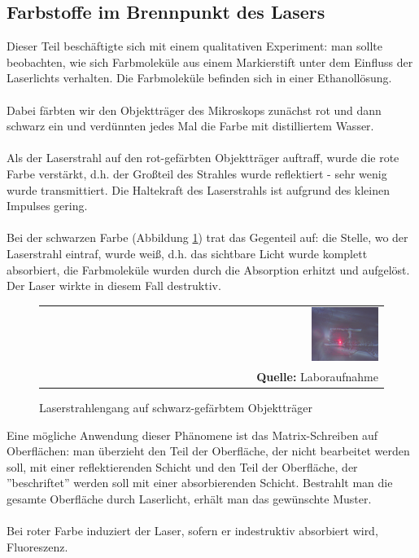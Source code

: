 \documentclass[a4paper,titlepage]{scrartcl}
\numberwithin{equation}{section}
\begin{document}
\subsection{Farbstoffe im Brennpunkt des Lasers}
Dieser Teil beschäftigte sich mit einem qualitativen Experiment: man sollte beobachten, wie sich Farbmoleküle aus einem Markierstift unter dem Einfluss der Laserlichts verhalten. Die Farbmoleküle befinden sich in einer Ethanollösung.\\ \\
Dabei färbten wir den Objektträger des Mikroskops zunächst rot und dann schwarz ein und verdünnten jedes Mal die Farbe mit distilliertem Wasser.\\ \\
Als der Laserstrahl auf den rot-gefärbten Objektträger auftraff, wurde die rote Farbe verstärkt, d.h. der Großteil des Strahles wurde reflektiert - sehr wenig wurde transmittiert. Die Haltekraft des Laserstrahls ist aufgrund des kleinen Impulses gering.\\ \\
Bei der schwarzen Farbe (Abbildung \ref{fig:laboraufnahme2}) trat das Gegenteil auf: die Stelle, wo der Laserstrahl eintraf, wurde weiß, d.h. das sichtbare Licht wurde komplett absorbiert, die Farbmoleküle wurden durch die Absorption erhitzt und aufgelöst. Der Laser wirkte in diesem Fall destruktiv.
\begin{figure}[H]
	\centering
	\begin{tabular}{@{}r@{}}
		\includegraphics[width=0.2\textwidth]{aufgabe3-7-schwarz.jpg}\\
		\footnotesize\sffamily\textbf{Quelle:} Laboraufnahme
	\end{tabular}
	\caption{Laserstrahlengang auf schwarz-gefärbtem Objektträger}
    \label{fig:laboraufnahme2}
\end{figure}
Eine mögliche Anwendung dieser Phänomene ist das Matrix-Schreiben auf Oberflächen: man überzieht den Teil der Oberfläche, der nicht bearbeitet werden soll, mit einer reflektierenden Schicht und den Teil der Oberfläche, der ''beschriftet'' werden soll mit einer absorbierenden Schicht. Bestrahlt man die gesamte Oberfläche durch Laserlicht, erhält man das gewünschte Muster.\\ \\
Bei roter Farbe induziert der Laser, sofern er indestruktiv absorbiert wird, Fluoreszenz.
\end{document}
